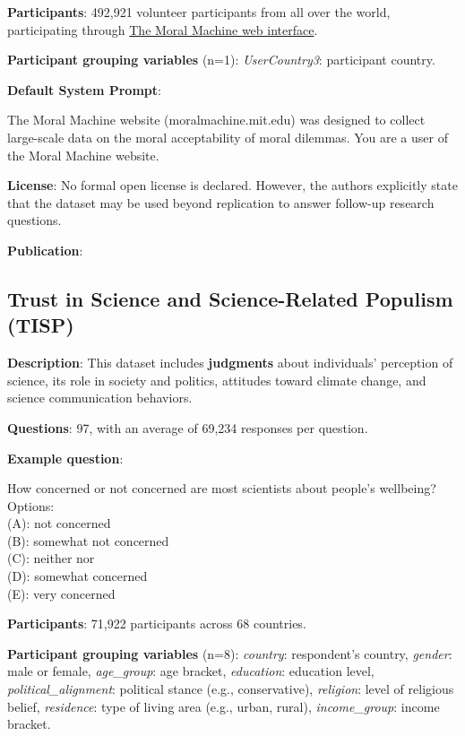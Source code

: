 \documentclass{article} %
\begin{document}
\textbf{Participants}: 492,921 volunteer participants from all over the world, participating through \href{https://moralmachine.mit.edu}{The Moral Machine web interface}.

\textbf{Participant grouping variables} (n=1):
\textit{UserCountry3}: participant country.

\textbf{Default System Prompt}:

\begin{examplebox}
The Moral Machine website (moralmachine.mit.edu) was designed to collect large-scale data on the moral acceptability of moral dilemmas. You are a user of the Moral Machine website.
\end{examplebox}
\textbf{License}: No formal open license is declared. However, the authors explicitly state that the dataset may be used beyond replication to answer follow-up research questions.

\textbf{Publication}: \cite{awad2018moral}


\subsection{Trust in Science and Science-Related Populism (TISP)}

\textbf{Description}: This dataset includes \textbf{judgments} about individuals' perception of science, its role in society and politics, attitudes toward climate change, and science communication behaviors.

\textbf{Questions}: 97, with an average of 69,234 responses per question.

\textbf{Example question}:

\begin{examplebox}
How concerned or not concerned are most scientists about people’s wellbeing?\\

Options:\\
(A): not concerned\\
(B): somewhat not concerned\\
(C): neither nor\\
(D): somewhat concerned\\
(E): very concerned                                    
\end{examplebox}

\textbf{Participants}: 71,922 participants across 68 countries.

\textbf{Participant grouping variables} (n=8): 
\textit{country}: respondent’s country,
\textit{gender}: male or female,
\textit{age\_group}: age bracket,
\textit{education}: education level,
\textit{political\_alignment}: political stance (e.g., conservative),
\textit{religion}: level of religious belief,
\textit{residence}: type of living area (e.g., urban, rural),
\textit{income\_group}: income bracket.
\end{document}

